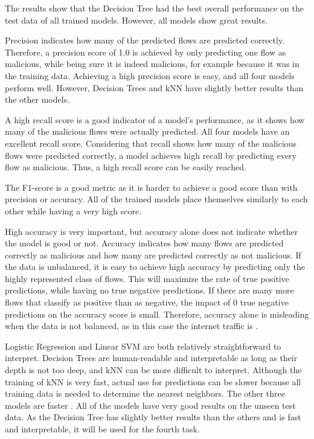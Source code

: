 \documentclass{article}
\begin{document}
The results show that the Decision Tree had the best overall performance on the test data of all trained models. However, all models show great results.

Precision indicates how many of the predicted flows are predicted correctly. Therefore, a precision score of 1.0 is achieved by only predicting one flow as malicious, while being sure it is indeed malicious, for example because it was in the training data. Achieving a high precision score is easy, and all four models perform well. However, Decision Trees and kNN have slightly better results than the other models.

A high recall score is a good indicator of a model's performance, as it shows how many of the malicious flows were actually predicted. All four models have an excellent recall score. Considering that recall shows how many of the malicious flows were predicted correctly, a model achieves high recall by predicting every flow as malicious. Thus, a high recall score can be easily reached.

The F1-score is a good metric as it is harder to achieve a good score than with precision or accuracy. All of the trained models place themselves similarly to each other while having a very high score.

High accuracy is very important, but accuracy alone does not indicate whether the model is good or not. Accuracy indicates how many flows are predicted correctly as malicious and how many are predicted correctly as not malicious. If the data is unbalanced, it is easy to achieve high accuracy by predicting only the highly represented class of flows. This will maximize the rate of true positive predictions, while having no true negative predictions. If there are many more flows that classify as positive than as negative, the impact of 0 true negative predictions on the accuracy score is small. Therefore, accuracy alone is misleading when the data is not balanced, as in this case the internet traffic is \cite{isnotes}.

Logistic Regression and Linear SVM are both relatively straightforward to interpret. Decision Trees are human-readable and interpretable as long as their depth is not too deep, and kNN can be more difficult to interpret. Although the training of kNN is very fast, actual use for predictions can be slower because all training data is needed to determine the nearest neighbors. The other three models are faster \cite{mathworks}. All of the models have very good results on the unseen test data. As the Decision Tree has slightly better results than the others and is fast and interpretable, it will be used for the fourth task.
\end{document}

